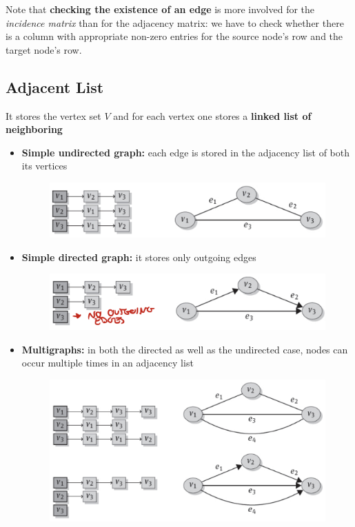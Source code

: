 Note that \textbf{checking the existence of an edge} is more involved for the \textit{incidence matrix} than for the adjacency matrix: we have to check whether there is a column with appropriate non-zero entries for the source node’s row and the target node’s row.

\subsection{Adjacent List}
It stores the vertex set \(V\) and for each vertex one stores a \textbf{linked list of neighboring}
\begin{itemize}
    \item \textbf{Simple undirected graph:} each edge is stored in the adjacency list of both its vertices
    \begin{figure}[!h]
        \centering
        \includegraphics[width=0.7\linewidth]{images/AdvancedDataManagment/graph_databases/adj_list_simple_undirected.jpeg}
        \end{figure}
    \newpage
    \item \textbf{Simple directed graph:} it stores only outgoing edges
    \begin{figure}[!h]
        \centering
        \includegraphics[width=0.7\linewidth]{images/AdvancedDataManagment/graph_databases/adj_list_simple_directed.jpeg}
        \end{figure}
    
    
    \item \textbf{Multigraphs:} in both the directed as well as the undirected case, nodes can occur multiple times in an adjacency list
    \begin{figure}[!h]
        \centering
        \includegraphics[width=0.7\linewidth]{images/AdvancedDataManagment/graph_databases/adj_list_multi.jpeg}
        \end{figure}
    
\end{itemize}
